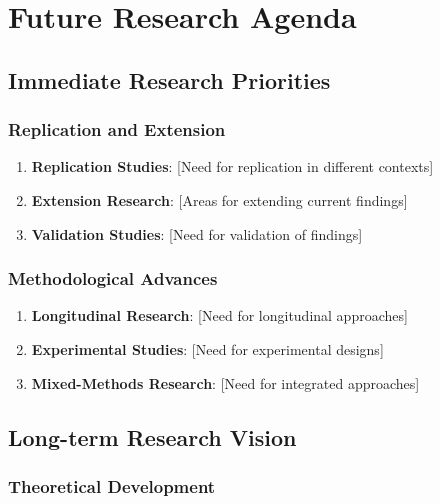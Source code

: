 \documentclass[
  12pt,
  letterpaper,
  12pt,
  letterpaper,
  oneside]{report}
\providecommand{\tightlist}{%
  \setlength{\itemsep}{0pt}\setlength{\parskip}{0pt}}
\begin{document}
\section{Future Research Agenda}\label{future-research-agenda}

\subsection{Immediate Research
Priorities}\label{immediate-research-priorities}

\subsubsection{Replication and
Extension}\label{replication-and-extension}

\begin{enumerate}
\def\labelenumi{\arabic{enumi}.}
\tightlist
\item
  \textbf{Replication Studies}: {[}Need for replication in different
  contexts{]}
\item
  \textbf{Extension Research}: {[}Areas for extending current
  findings{]}
\item
  \textbf{Validation Studies}: {[}Need for validation of findings{]}
\end{enumerate}

\subsubsection{Methodological Advances}\label{methodological-advances}

\begin{enumerate}
\def\labelenumi{\arabic{enumi}.}
\tightlist
\item
  \textbf{Longitudinal Research}: {[}Need for longitudinal approaches{]}
\item
  \textbf{Experimental Studies}: {[}Need for experimental designs{]}
\item
  \textbf{Mixed-Methods Research}: {[}Need for integrated approaches{]}
\end{enumerate}

\subsection{Long-term Research Vision}\label{long-term-research-vision}

\subsubsection{Theoretical Development}\label{theoretical-development-1}
\end{document}
